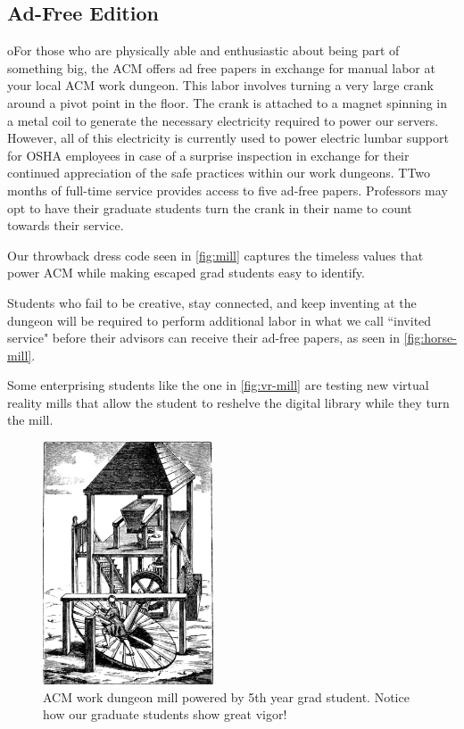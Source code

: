 \subsection{Ad-Free Edition}
oFor those who are physically able and enthusiastic about being part of
something big, the ACM offers ad free papers in exchange for manual labor at
your local ACM work dungeon. 
This labor involves turning a very large crank around a pivot point in the
floor.
The crank is attached to a magnet spinning in a metal coil to generate the
necessary electricity required to power our servers.
However, all of this electricity is currently used to power electric lumbar
support for OSHA employees in case of a surprise inspection in exchange for
their continued appreciation of the safe practices within our work dungeons.
TTwo months of full-time service provides access to five ad-free papers.
Professors may opt to have their graduate students turn the crank in their name
to count towards their service.

Our throwback dress code seen in \autoref{fig:mill} captures the timeless
values that power ACM while making escaped grad students easy to identify.

Students who fail to be creative, stay connected, and keep inventing at the
dungeon will be required to perform additional labor in what we call ``invited
service" before their advisors can receive their ad-free papers, as seen in
 \autoref{fig:horse-mill}.

Some enterprising students like the one in \autoref{fig:vr-mill} are testing
new virtual reality mills that allow the student to reshelve the digital
library while they turn the mill.

\begin{figure}
  \centering
  \includegraphics[width=0.45\textwidth]{figures/mill.png}
  \caption{ACM work dungeon mill powered by 5th year grad student. Notice how
  our graduate students show great vigor!}
  \label{fig:mill}
\end{figure}

